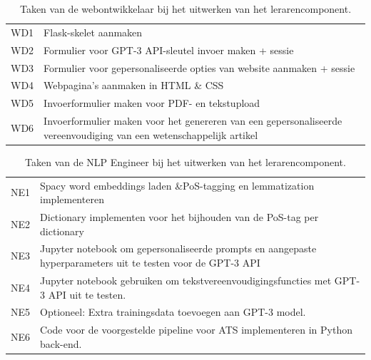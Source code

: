 \begin{center}
	\begin{table}
		\begin{tabular}{ | m{2cm} | m{12cm} | } 
			\hline
			WD1 & Flask-skelet aanmaken \\
			WD2 & Formulier voor GPT-3 API-sleutel invoer maken + sessie \\
			WD3 & Formulier voor gepersonaliseerde opties van website aanmaken + sessie \\
			WD4 & Webpagina's aanmaken in HTML \& CSS \\
			WD5 & Invoerformulier maken voor PDF- en tekstupload \\
			WD6 & Invoerformulier maken voor het genereren van een gepersonaliseerde vereenvoudiging van een wetenschappelijk artikel \\
			\hline
		\end{tabular}
		\caption{Taken van de webontwikkelaar bij het uitwerken van het lerarencomponent.}
		\label{table:tasks-web-engineer}
	\end{table}
\end{center}

\begin{center}
	\begin{table}[H]
		\begin{tabular}{ | m{2cm} | m{12cm} | } 
			\hline
			NE1 & Spacy word embeddings laden \&PoS-tagging en lemmatization implementeren \\
			NE2 & Dictionary implementen voor het bijhouden van de PoS-tag per dictionary \\
			NE3 & Jupyter notebook om gepersonaliseerde prompts en aangepaste hyperparameters uit te testen voor de GPT-3 API \\
			NE4 & Jupyter notebook gebruiken om tekstvereenvoudigingsfuncties met GPT-3 API uit te testen. \\
			NE5 & Optioneel: Extra trainingsdata toevoegen aan GPT-3 model. \\
			NE6 & Code voor de voorgestelde pipeline voor ATS implementeren in Python back-end. \\
			\hline
		\end{tabular}
		\caption{Taken van de NLP Engineer bij het uitwerken van het lerarencomponent.}
		\label{table:tasks-nlp-engineer}
	\end{table}
\end{center}


